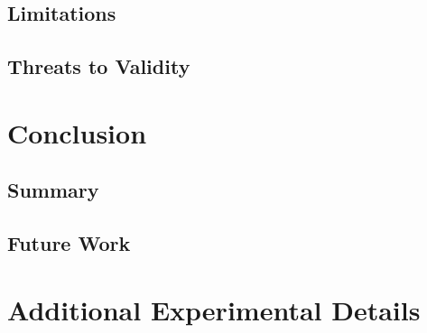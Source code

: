 \documentclass[11pt,a4paper,oneside]{report}
\begin{document}
\section{Limitations}

\section{Threats to Validity}

\chapter{Conclusion}
\label{ch:conclusion}

\section{Summary}

\section{Future Work}

\printbibliography[heading=bibintoc,title={References}]

\appendix
\chapter{Additional Experimental Details}
\end{document}
